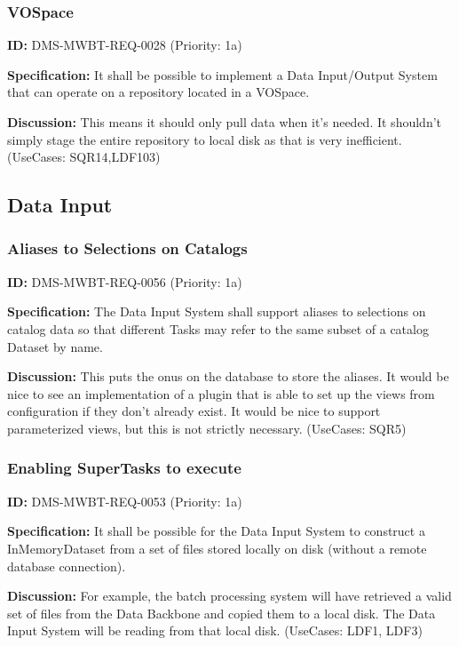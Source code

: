 \documentclass[SE,toc,lsstdraft]{lsstdoc}
\begin{document}
\subsubsection{VOSpace}

\label{DMS-MWBT-REQ-0028}
\textbf{ID:} DMS-MWBT-REQ-0028 (Priority: 1a)

\textbf{Specification:}
It shall be possible to implement a Data Input/Output System that can operate on a repository located in a VOSpace.

\textbf{Discussion:}
This means it should only pull data when it's needed. It shouldn't simply stage the entire repository to local disk as that is very inefficient. (UseCases: SQR14,LDF103)

\subsection{Data Input}

\subsubsection{Aliases to Selections on Catalogs}

\label{DMS-MWBT-REQ-0056}
\textbf{ID:} DMS-MWBT-REQ-0056 (Priority: 1a)

\textbf{Specification:}
The Data Input System shall support aliases to selections on catalog data so that different Tasks may refer to the same subset of a catalog Dataset by name.

\textbf{Discussion:}
This puts the onus on the database to store the aliases. It would be nice to see an implementation of a plugin that is able to set up the views from configuration if they don't already exist. It would be nice to support parameterized views, but this is not strictly necessary. (UseCases: SQR5)

\subsubsection{Enabling SuperTasks to execute}

\label{DMS-MWBT-REQ-0053}
\textbf{ID:} DMS-MWBT-REQ-0053 (Priority: 1a)

\textbf{Specification:}
It shall be possible for the Data Input System to construct a InMemoryDataset from a set of files stored locally on disk (without a remote database connection).

\textbf{Discussion:}
For example, the batch processing system will have retrieved a valid set of files from the Data Backbone and copied them to a local disk. The Data Input System will be reading from that local disk. (UseCases: LDF1, LDF3)
\end{document}
